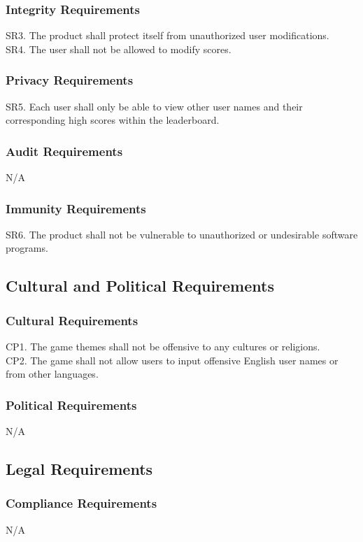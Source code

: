 \documentclass[12pt]{article}
\begin{document}
    \subsubsection{Integrity Requirements}
    SR3. The product shall protect itself from unauthorized user modifications.\\
    SR4. The user shall not be allowed to modify scores.
    
    \subsubsection{Privacy Requirements}
    SR5. Each user shall only be able to view other user names and their corresponding high scores within the leaderboard.
    
    \subsubsection{Audit Requirements}
    N/A
    
    \subsubsection{Immunity Requirements}
    SR6. The product shall not be vulnerable to unauthorized or undesirable software programs.
    
\subsection{Cultural and Political Requirements}
    \subsubsection{Cultural Requirements}
    CP1. The game themes shall not be offensive to any cultures or religions. \\
    CP2. The game shall not allow users to input offensive English user names or from other languages.

    \subsubsection{Political Requirements}    N/A
    
\subsection{Legal Requirements}
    \subsubsection{Compliance Requirements}
    N/A
    
\end{document}
